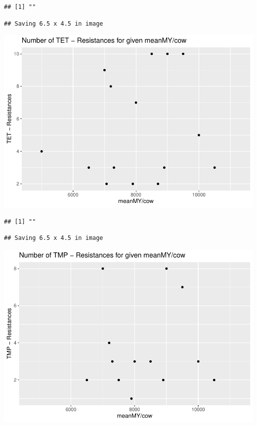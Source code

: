 \documentclass[
]{article}
\begin{document}
\begin{verbatim}
## [1] ""
\end{verbatim}

\begin{verbatim}
## Saving 6.5 x 4.5 in image
\end{verbatim}

\includegraphics{NResistenzen_files/figure-latex/numerical_variables-8.pdf}

\begin{verbatim}
## [1] ""
\end{verbatim}

\begin{verbatim}
## Saving 6.5 x 4.5 in image
\end{verbatim}

\includegraphics{NResistenzen_files/figure-latex/numerical_variables-9.pdf}
\end{document}
